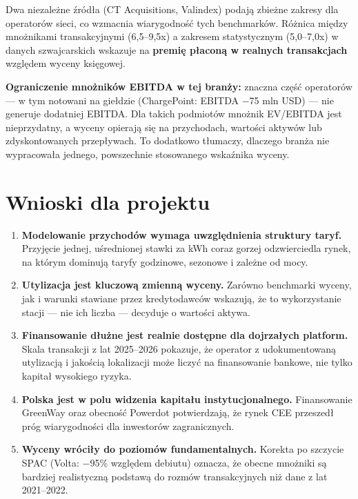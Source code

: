 \documentclass[11pt,a4paper]{article}
\begin{document}
	Dwa niezależne źródła (CT Acquisitions, Valindex) podają zbieżne zakresy dla
	operatorów sieci, co wzmacnia wiarygodność tych benchmarków. Różnica między
	mnożnikami transakcyjnymi (6,5--9,5x) a zakresem statystycznym (5,0--7,0x)
	w danych szwajcarskich wskazuje na \textbf{premię płaconą w realnych
		transakcjach} względem wyceny księgowej.
	
	\begin{zastrzezenie}
		\textbf{Ograniczenie mnożników EBITDA w tej branży:} znaczna część
		operatorów --- w tym notowani na giełdzie (ChargePoint: EBITDA $-$75 mln USD)
		--- nie generuje dodatniej EBITDA. Dla takich podmiotów mnożnik EV/EBITDA
		jest nieprzydatny, a wyceny opierają się na przychodach, wartości aktywów
		lub zdyskontowanych przepływach. To dodatkowo tłumaczy, dlaczego branża nie
		wypracowała jednego, powszechnie stosowanego wskaźnika wyceny.
	\end{zastrzezenie}
	
	\section{Wnioski dla projektu}
	
	\begin{enumerate}[leftmargin=1.3em, itemsep=5pt]
		\item \textbf{Modelowanie przychodów wymaga uwzględnienia struktury taryf.}
		Przyjęcie jednej, uśrednionej stawki za kWh coraz gorzej odzwierciedla rynek,
		na którym dominują taryfy godzinowe, sezonowe i zależne od mocy.
		
		\item \textbf{Utylizacja jest kluczową zmienną wyceny.} Zarówno benchmarki
		wyceny, jak i warunki stawiane przez kredytodawców wskazują, że to
		wykorzystanie stacji --- nie ich liczba --- decyduje o wartości aktywa.
		
		\item \textbf{Finansowanie dłużne jest realnie dostępne dla dojrzałych
			platform.} Skala transakcji z lat 2025--2026 pokazuje, że operator
		z udokumentowaną utylizacją i jakością lokalizacji może liczyć na
		finansowanie bankowe, nie tylko kapitał wysokiego ryzyka.
		
		\item \textbf{Polska jest w polu widzenia kapitału instytucjonalnego.}
		Finansowanie GreenWay oraz obecność Powerdot potwierdzają, że rynek CEE
		przeszedł próg wiarygodności dla inwestorów zagranicznych.
		
		\item \textbf{Wyceny wróciły do poziomów fundamentalnych.} Korekta po
		szczycie SPAC (Volta: $-$95\% względem debiutu) oznacza, że obecne mnożniki
		są bardziej realistyczną podstawą do rozmów transakcyjnych niż dane
		z lat 2021--2022.
	\end{enumerate}
	
\end{document}

